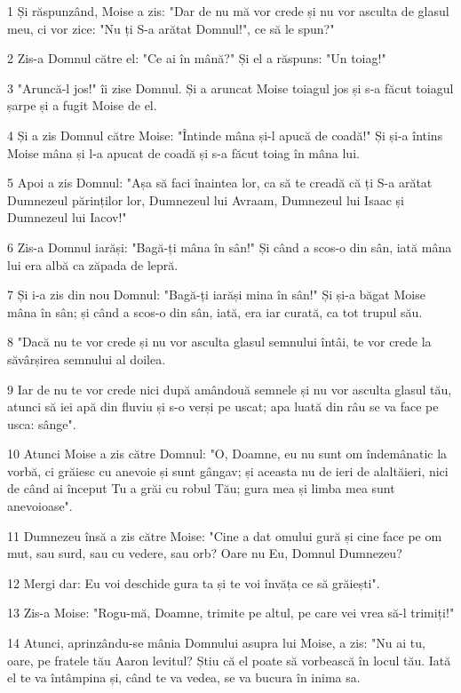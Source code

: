 \par 1 Și răspunzând, Moise a zis: "Dar de nu mă vor crede și nu vor asculta de glasul meu, ci vor zice: "Nu ți S-a arătat Domnul!", ce să le spun?"
\par 2 Zis-a Domnul către el: "Ce ai în mână?" Și el a răspuns: "Un toiag!"
\par 3 "Aruncă-l jos!" îi zise Domnul. Și a aruncat Moise toiagul jos și s-a făcut toiagul șarpe și a fugit Moise de el.
\par 4 Și a zis Domnul către Moise: "Întinde mâna și-l apucă de coadă!" Și și-a întins Moise mâna și l-a apucat de coadă și s-a făcut toiag în mâna lui.
\par 5 Apoi a zis Domnul: "Așa să faci înaintea lor, ca să te creadă că ți S-a arătat Dumnezeul părinților lor, Dumnezeul lui Avraam, Dumnezeul lui Isaac și Dumnezeul lui Iacov!"
\par 6 Zis-a Domnul iarăși: "Bagă-ți mâna în sân!" Și când a scos-o din sân, iată mâna lui era albă ca zăpada de lepră.
\par 7 Și i-a zis din nou Domnul: "Bagă-ți iarăși mina în sân!" Și și-a băgat Moise mâna în sân; și când a scos-o din sân, iată, era iar curată, ca tot trupul său.
\par 8 "Dacă nu te vor crede și nu vor asculta glasul semnului întâi, te vor crede la săvârșirea semnului al doilea.
\par 9 Iar de nu te vor crede nici după amândouă semnele și nu vor asculta glasul tău, atunci să iei apă din fluviu și s-o verși pe uscat; apa luată din râu se va face pe usca: sânge".
\par 10 Atunci Moise a zis către Domnul: "O, Doamne, eu nu sunt om îndemânatic la vorbă, ci grăiesc cu anevoie și sunt gângav; și aceasta nu de ieri de alaltăieri, nici de când ai început Tu a grăi cu robul Tău; gura mea și limba mea sunt anevoioase".
\par 11 Dumnezeu însă a zis către Moise: "Cine a dat omului gură și cine face pe om mut, sau surd, sau cu vedere, sau orb? Oare nu Eu, Domnul Dumnezeu?
\par 12 Mergi dar: Eu voi deschide gura ta și te voi învăța ce să grăiești".
\par 13 Zis-a Moise: "Rogu-mă, Doamne, trimite pe altul, pe care vei vrea să-l trimiți!"
\par 14 Atunci, aprinzându-se mânia Domnului asupra lui Moise, a zis: "Nu ai tu, oare, pe fratele tău Aaron levitul? Știu că el poate să vorbească în locul tău. Iată el te va întâmpina și, când te va vedea, se va bucura în inima sa.
